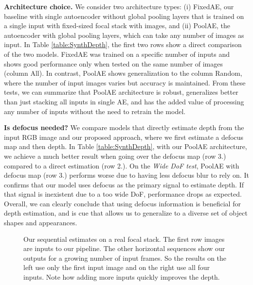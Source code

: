 \documentclass[10pt,twocolumn,letterpaper]{article}
\begin{document}
\noindent\textbf{Architecture choice.} We consider two architecture types: (i) FixedAE, our baseline with single autoencoder without global pooling layers that is trained on a single input with fixed-sized focal stack with  images, and (ii) PoolAE, the autoencoder with global pooling layers, which can take any number of images as input. 
In Table \ref{table:SynthDepth}, the first two rows show a direct comparison of the two models. 
FixedAE was trained on a specific number of inputs and shows good performance only when tested on the same number of images (column All).
In contrast, PoolAE shows generalization to the column Random, where the number of input images varies but accuracy is maintained.
From these tests, we can summarize that PoolAE architecture is robust, generalizes better than just stacking all inputs in single AE, and has the added value of processing any number of inputs without the need to retrain the model.




\noindent\textbf{Is defocus needed?} We compare models that directly estimate depth from the input RGB image and our proposed approach, where we first estimate a defocus map and then depth.
In Table \ref{table:SynthDepth}, with our PoolAE architecture, we achieve a much better result when going over the defocus map (row 3.) compared to a direct estimation (row 2.). 
On the {\it Wide DoF test}, PoolAE with defocus map (row 3.) performs worse due to having less defocus blur to rely on. It confirms that our model uses defocus as the primary signal to estimate depth. If that signal is inexistent due to a too wide DoF, performance drops as expected.
Overall, we can clearly conclude that using defocus information is beneficial for depth estimation, and is cue that allows us to generalize to a diverse set of object shapes and appearances.


\begin{figure}
\begin{center}
\end{center}
\vspace{-0.3cm}
   \caption{Our sequential estimates on a real focal stack. The first row images are inputs to our pipeline. The other horizontal sequences show our outputs for a growing number of input frames. So the results on the left use only the first input image and on the right use all four inputs. Note how adding more inputs quickly improves the depth.
   }
\label{fig:SynthDefocus}
\end{figure}
\end{document}
